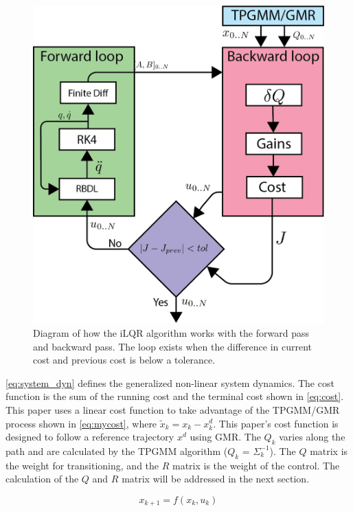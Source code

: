 \begin{figure}[h]
    \centering
    \includegraphics{images/controllers/ilqr2.png}
    \caption[iLQR Learning Loop Diagram]{Diagram of how the iLQR algorithm works with the forward pass and backward pass. The loop exists when the difference in current cost and previous cost is below a tolerance. }
    \label{fig:ilqrDiagram}
\end{figure}



\autoref{eq:system_dyn} defines the  generalized non-linear system dynamics. The cost function is the sum of the running cost and the terminal cost shown in \autoref{eq:cost}. This paper uses a linear cost function to take advantage of the TPGMM/GMR process shown in \autoref{eq:mycost}, where $\tilde{x}_k = x_k - x^{d}_k$. This paper's cost function is designed to follow a reference trajectory $x^{d}$ using GMR. The $Q_k$ varies along the path and  are calculated by the TPGMM algorithm ($Q_k$ =  $\Sigma_k^{-1}$). The  $Q$ matrix is the weight for transitioning, and the $R$ matrix is the weight of the control. The calculation of the $Q$ and $R$ matrix will be addressed in the next section.

\begin{equation}
     x_{k+1} = f(x_k,u_k) 
     \label{eq:system_dyn}
\end{equation}

